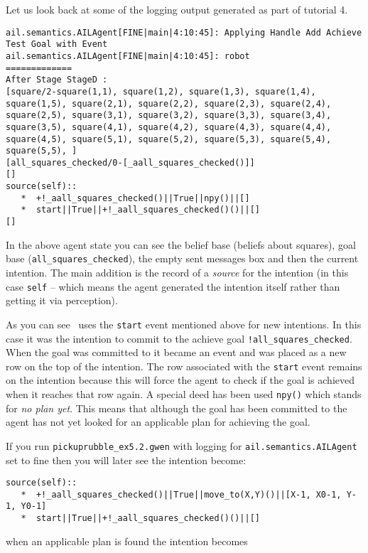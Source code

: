Let us look back at some of the logging output generated as part of tutorial 4.

\begin{verbatim}
ail.semantics.AILAgent[FINE|main|4:10:45]: Applying Handle Add Achieve Test Goal with Event 
ail.semantics.AILAgent[FINE|main|4:10:45]: robot
=============
After Stage StageD :
[square/2-square(1,1), square(1,2), square(1,3), square(1,4), square(1,5), square(2,1), square(2,2), square(2,3), square(2,4), square(2,5), square(3,1), square(3,2), square(3,3), square(3,4), square(3,5), square(4,1), square(4,2), square(4,3), square(4,4), square(4,5), square(5,1), square(5,2), square(5,3), square(5,4), square(5,5), ]
[all_squares_checked/0-[_aall_squares_checked()]]
[]
source(self):: 
   *  +!_aall_squares_checked()||True||npy()||[]
   *  start||True||+!_aall_squares_checked()()||[]
[] 
\end{verbatim}
In the above agent state you can see the belief base (beliefs about squares), goal base (\texttt{all\_squares\_checked}), the empty sent messages box and then the current intention.  The main addition is the record of a \emph{source} for the intention (in this case \texttt{self} -- which means the agent generated the intention itself rather than getting it via perception).

As you can see \gwendolen\ uses the \texttt{start} event mentioned above for new intentions.  In this case it was the intention to commit to the achieve goal \lstinline{!all_squares_checked}.  When the goal was committed to it became an event and was placed as a new row on the top of the intention.  The row associated with the \texttt{start} event remains on the intention because this will force the agent to check if the goal is achieved when it reaches that row again.  A special deed has been used \texttt{npy()} which stands for \emph{no plan yet}.  This means that although the goal has been committed to the agent has not yet looked for an applicable plan for achieving the goal.

If you run \texttt{pickuprubble\_ex5.2.gwen} with logging for \texttt{ail.semantics.AILAgent} set to fine then you will later see the intention become:
\begin{verbatim}
source(self):: 
   *  +!_aall_squares_checked()||True||move_to(X,Y)()||[X-1, X0-1, Y-1, Y0-1]
   *  start||True||+!_aall_squares_checked()()||[]
\end{verbatim}
when an applicable plan is found the intention becomes

